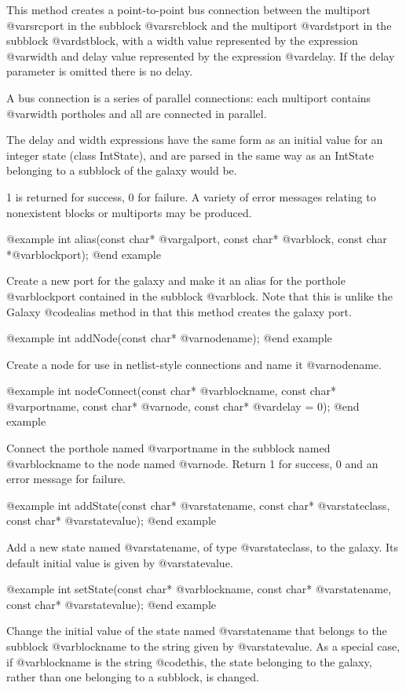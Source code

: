 This method creates a point-to-point bus connection between the multiport
@var{srcport} in the subblock @var{srcblock} and the multiport @var{dstport}
in the subblock @var{dstblock}, with a width value represented by the
expression @var{width} and delay value represented by
the expression @var{delay}.  If the delay parameter is omitted there is
no delay.

A bus connection is a series of parallel connections: each multiport
contains @var{width} portholes and all are connected in parallel.

The delay and width expressions have the same form as an initial value for an
integer state (class IntState), and are parsed in the same way as
an IntState belonging to a subblock of the galaxy would be.

1 is returned for success, 0 for failure.
A variety of error messages relating to nonexistent blocks or multiports
may be produced.

@example
int alias(const char* @var{galport}, const char* @var{block}, const char *@var{blockport});
@end example

Create a new port for the galaxy and make it an alias for the porthole
@var{blockport} contained in the subblock @var{block}.  Note that this
is unlike the Galaxy @code{alias} method in that this method creates
the galaxy port.

@example
int addNode(const char* @var{nodename});
@end example

Create a node for use in netlist-style connections and name it
@var{nodename}.

@example
int nodeConnect(const char* @var{blockname}, const char* @var{portname},
                const char* @var{node}, const char* @var{delay} = 0);
@end example

Connect the porthole named @var{portname} in the subblock named
@var{blockname} to the node named @var{node}.  Return 1 for success,
0 and an error message for failure.

@example
int addState(const char* @var{statename}, const char* @var{stateclass},
             const char* @var{statevalue});
@end example

Add a new state named @var{statename}, of type @var{stateclass},
to the galaxy.  Its default initial value is given by @var{statevalue}.

@example
int setState(const char* @var{blockname}, const char* @var{statename},
             const char* @var{statevalue});
@end example

Change the initial value of the state named @var{statename} that belongs
to the subblock @var{blockname} to the string given by @var{statevalue}.
As a special case, if @var{blockname} is the string @code{this}, the
state belonging to the galaxy, rather than one belonging to a subblock,
is changed.

